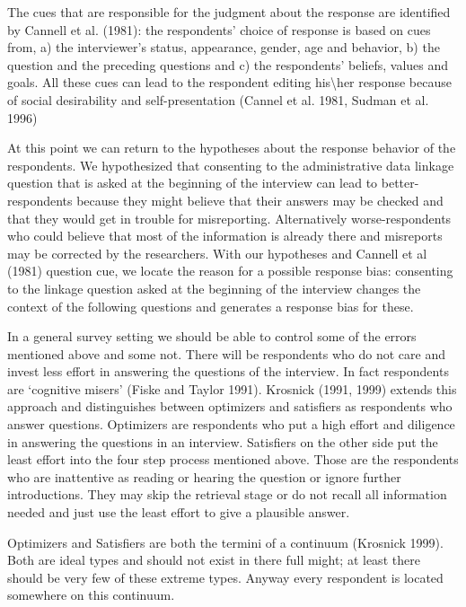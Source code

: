 The cues that are responsible for the judgment about the response are identified by Cannell et al. (1981): the respondents' choice of response is based on cues from, a) the interviewer's status, appearance, gender, age and behavior, b) the question and the preceding questions and c) the respondents' beliefs, values and goals. All these cues can lead to the respondent editing his\textbackslash her response because of social desirability and self-presentation (Cannel et al. 1981, Sudman et al. 1996)

At this point we can return to the hypotheses about the response behavior of the respondents. We hypothesized that consenting to the administrative data linkage question that is asked at the beginning of the interview can lead to better-respondents because they might believe that their answers may be checked and that they would get in trouble for misreporting. Alternatively worse-respondents who could believe that most of the information is already there and misreports may be corrected by the researchers. With our hypotheses and Cannell et al (1981) question cue, we locate the reason for a possible response bias: consenting to the linkage question asked at the beginning of the interview changes the context of the following questions and generates a response bias for these. 

In a general survey setting we should be able to control some of the errors mentioned above and some not. There will be respondents who do not care and invest less effort in answering the questions of the interview. In fact respondents are `cognitive misers' (Fiske and Taylor 1991). Krosnick (1991, 1999) extends this approach and distinguishes between optimizers and satisfiers as respondents who answer questions. Optimizers are respondents who put a high effort and diligence in answering the questions in an interview. Satisfiers on the other side put the least effort into the four step process mentioned above. Those are the respondents who are inattentive as reading or hearing the question or ignore further introductions. They may skip the retrieval stage or do not recall all information needed and just use the least effort to give a plausible answer.

Optimizers and Satisfiers are both the termini of a continuum (Krosnick 1999). Both are ideal types and should not exist in there full might; at least there should be very few of these extreme types. Anyway every respondent is located somewhere on this continuum. 

